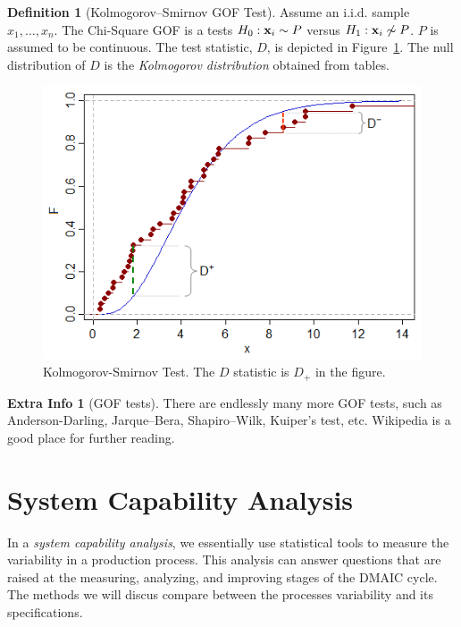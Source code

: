 \documentclass[12pt,a4paper]{report}
\theoremstyle{plain}
\theoremstyle{definition}
\newtheorem{definition}{Definition}
\newtheorem{extra}{Extra Info}
\begin{document}
\begin{definition}[Kolmogorov–Smirnov GOF Test]
Assume an i.i.d. sample $x_1,\dots,x_n$. 
The Chi-Square GOF is a tests $H_0: \mathbf{x}_i \sim P$ versus $H_1: \mathbf{x}_i \not\sim P$.
$P$ is assumed to be continuous.
The test statistic, $D$, is depicted in Figure~\ref{fig:ks_test}.
The null distribution of $D$ is the \emph{Kolmogorov distribution} obtained from tables.

\begin{figure}
\centering
\includegraphics[height=0.3\textheight]{art/Kgn0O}
\caption[Kolmogorov-Smirnov Test]{Kolmogorov-Smirnov Test. The $D$ statistic is $D_+$ in the figure.}
\label{fig:ks_test}
\end{figure}

\end{definition} 






\begin{extra}[GOF tests]
There are endlessly many more GOF tests, such as Anderson-Darling, Jarque–Bera, Shapiro–Wilk, Kuiper's test, etc.
Wikipedia is a good place for further reading.
\end{extra}

\chapter{System Capability Analysis}
\label{sec:capability_analysis}

In a \emph{system capability analysis}, we essentially use statistical tools to measure the variability in a production process.
This analysis can answer questions that are raised at the measuring, analyzing, and improving stages of the DMAIC cycle. 
The methods we will discus compare between the processes variability and its specifications. 
\end{document}
